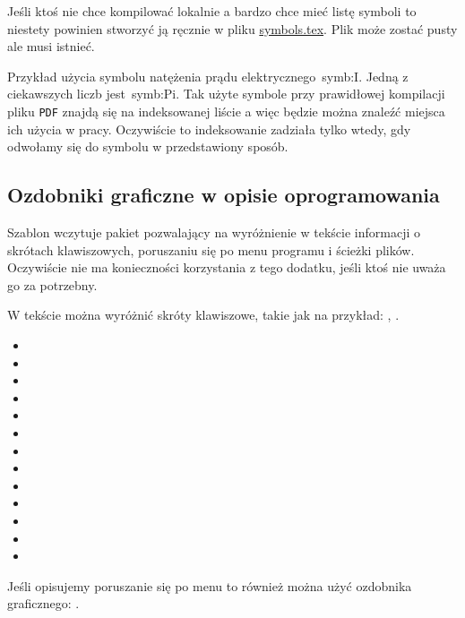 Jeśli ktoś nie chce kompilować lokalnie a bardzo chce mieć listę symboli to niestety powinien stworzyć ją ręcznie w pliku \href{./symbols.tex}{symbols.tex}. Plik może zostać pusty ale musi istnieć.

Przykład użycia symbolu natężenia prądu elektrycznego~\gls{symb:I}. Jedną z ciekawszych liczb jest~\gls{symb:Pi}. Tak użyte symbole przy prawidłowej kompilacji pliku \texttt{PDF} znajdą się na indeksowanej liście a więc będzie można znaleźć miejsca ich użycia w pracy. Oczywiście to indeksowanie zadziała tylko wtedy, gdy odwołamy się do symbolu w przedstawiony sposób.

\subsection{Ozdobniki graficzne w opisie oprogramowania}
Szablon wczytuje pakiet pozwalający na wyróżnienie w tekście informacji o skrótach klawiszowych, poruszaniu się po menu programu i ścieżki plików. Oczywiście nie ma konieczności korzystania z tego dodatku, jeśli ktoś nie uważa go za potrzebny.

W tekście można wyróżnić skróty klawiszowe, takie jak na przykład: , \keys{\ctrl, \Alt, \del}.
\begin{itemize}
    \item {}
    \item \keys{\Space} \keys{\SPACE}
    \item \keys{\backspace} \keys{\del} \keys{\backdel}
    \item \keys{\return} \keys{\enter}
    \item \keys{\shift} \keys{\capslock}
    \item \keys{\ctrl} \keys{\Alt} \keys{\AltGr}
    \item \keys{\tab}
    \item \keys{\esc} \keys{\oldesc}
    \item \keys{\winmenu}
    \item \keys{\arrowkey{^}} \keys{\arrowkeyup}
    \item {} \keys{\arrowkeydown}
    \item \keys{\arrowkey{>}} \keys{\arrowkeyright}
    \item \keys{\arrowkey{<}} \keys{\arrowkeyleft}
\end{itemize}

Jeśli opisujemy poruszanie się po menu to również można użyć ozdobnika graficznego: .

